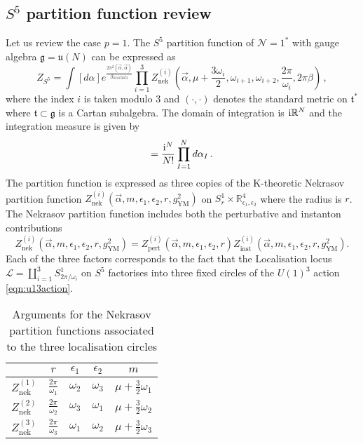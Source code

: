 \documentclass[main.tex]{subfiles}
\begin{document}
\subsection{$S^5$ partition function review}
Let us review the case $p=1$. 
The $S^5$ partition function of $\mathcal{N}=1^*$ with gauge algebra $\mathfrak{g}=\mathfrak{u}(N)$ can be expressed as \cite{Kim:2012ava,Lockhart:2012vp,Bullimore:2014upa,Kim:2016usy,Kim:2012qf,Kim:2013nva}
\begin{equation}\label{eqn:S5partition}
Z_{S^5}=\int[d\alpha]e^{\frac{2\pi^2(\vec{\alpha},\vec{\alpha})}{\beta\omega_1\omega_2\omega_3}}\prod_{i=1}^3Z^{(i)}_{\text{nek}}\left(\vec{\alpha},\mu+\frac{3\omega_i}{2},\omega_{i+1},\omega_{i+2},\frac{2\pi}{\omega_i},2\pi\beta\right)\,,
\end{equation}
where the index $i$ is taken modulo $3$ and $(\cdot,\cdot)$ denotes the standard metric on $\mathfrak{t}^*$ where $\mathfrak{t}\subset\mathfrak{g}$ is a Cartan subalgebra. The domain of integration is $\mathrm{i}\mathbb{R}^N$ and the integration measure is given by
\begin{equation}
[d\alpha]=\frac{\iu^{N}}{N!}\prod_{I=1}^Nd\alpha_I\,.
\end{equation}
The partition function is expressed as three copies of the K-theoretic Nekrasov partition function $Z^{(i)}_{\text{nek}}(\vec{\alpha},m,\epsilon_1,\epsilon_2,r,g^2_{\text{YM}})$ on $S_r^1\times\mathbb{R}^4_{\epsilon_1,\epsilon_2}$ where the radius is $r$. The Nekrasov partition function includes both the perturbative and instanton contributions 
\begin{equation}\label{eqn:Nekdecomp}
Z^{(i)}_{\text{nek}}(\vec{\alpha},m,\epsilon_1,\epsilon_2,r,g^2_{\text{YM}})=Z^{(i)}_{\text{pert}}(\vec{\alpha},m,\epsilon_1,\epsilon_2,r)Z^{(i)}_{\text{inst}}(\vec{\alpha},m,\epsilon_1,\epsilon_2,r,g^2_{\text{YM}}).
\end{equation}
Each of the three factors corresponds to the fact that the Localisation locus $\mathcal{L}=\coprod_{i=1}^3 S^1_{2\pi/\omega_i}$ on $S^5$ factorises into three fixed circles of the $U(1)^3$ action \eqref{eqn:u13action}. 
\begin{table}[h!]
\centering
\begin{tabular}{|c c c c c|} 
 \hline
 & $r$ & $\epsilon_1$ & $\epsilon_2$ & $m$ \\ [0.5ex] 
 \hline\hline
  $Z^{(1)}_{\text{nek}}$ & $\frac{2\pi}{\omega_1}$ & $\omega_2$ & $\omega_3$ &$\mu+\frac{3}{2}\omega_1$ \\ 
  $Z^{(2)}_{\text{nek}}$ & $\frac{2\pi}{\omega_2}$ & $\omega_3$ & $\omega_1$ &$\mu+\frac{3}{2}\omega_2$ \\ 
    $Z^{(3)}_{\text{nek}}$ & $\frac{2\pi}{\omega_3}$ & $\omega_1$ & $\omega_2$ &$\mu+\frac{3}{2}\omega_3$ \\ 
 \hline
\end{tabular}
\caption{Arguments for the Nekrasov partition functions associated to the three localisation circles}
\label{table:localisationparams}
\end{table}
\end{document}
